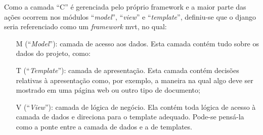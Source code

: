 \begin{description}
\begin{itemize}
        \end{itemize}
        Como a camada ``C'' é gerenciada pelo próprio framework e a maior parte das ações ocorrem nos módulos ``\textit{model}'', ``\textit{view}'' e ``\textit{template}'', definiu-se que o \gls{django} seria referenciado como um \textit{framework} \gls{mvt}, no qual:
        \begin{itemize}
	        \item[M](``\textit{Model}''): camada de acesso aos dados. Esta camada contém tudo sobre os dados do projeto, como:
	        \item[T](``\textit{Template}''): camada de apresentação. Esta camada contém decisões relativas à apresentação como, por exemplo, a maneira na qual algo deve ser mostrado em uma página web ou outro tipo de documento;
            \item[V](``\textit{View}''): camada de lógica de negócio. Ela contém toda lógica de acesso à camada de dados e direciona para o template adequado. Pode-se pensá-la como a ponte entre a camada de dados e a de templates.
        \end{itemize}
\end{description}
